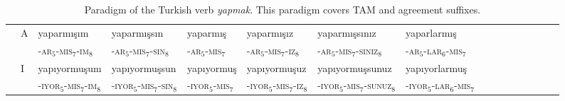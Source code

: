 \documentclass[11pt,letterpaper]{article}
\begin{document}
\begin{table}
{\begin{tabular}{ll||lll|lllllllllll}
               & A & yaparmışım &	yaparmışsın &	yaparmış &	yaparmışız &	yaparmışsınız& 	yaparlarmış \\ 
            &  & -\textsc{ar}$_5$-\textsc{mis}$_7$-\textsc{im}$_8$ &	-\textsc{ar}$_5$-\textsc{mis}$_7$-\textsc{sin}$_8$ &	-\textsc{ar}$_5$-\textsc{mis}$_7$ &	-\textsc{ar}$_5$-\textsc{mis}$_7$-\textsc{iz}$_8$ &	-\textsc{ar}$_5$-\textsc{mis}$_7$-\textsc{siniz}$_8$& 	-\textsc{ar}$_5$-\textsc{lar}$_6$-\textsc{mis}$_7$ \\ \hline
               & I & yapıyormuşum &	yapıyormuşsun &	yapıyormuş &	yapıyormuşuz &	yapıyormuşsunuz &	yapıyorlarmuş \\
	       &              & -\textsc{iyor}$_5$-\textsc{mis}$_7$-\textsc{im}$_8$ &	-\textsc{iyor}$_5$-\textsc{mis}$_7$-\textsc{sin}$_8$ &	-\textsc{iyor}$_5$-\textsc{mis}$_7$ &	-\textsc{iyor}$_5$-\textsc{mis}$_7$-\textsc{iz}$_8$ &	-\textsc{iyor}$_5$-\textsc{mis}$_7$-\textsc{sunuz}$_8$ &	-\textsc{iyor}$_5$-\textsc{lar}$_6$-\textsc{mis}$_7$ \\
\end{tabular}
}
\caption{Paradigm of the Turkish verb \textit{yapmak}. This paradigm covers TAM and agreement suffixes.}\label{tab:turkish-yapmak}
\end{table}
\end{document}
